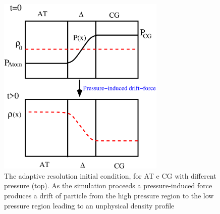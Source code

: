 \documentclass[aps,prb,preprint,citeautoscript]{revtex4}
\begin{document}
\begin{figure}
  \centering
  \includegraphics[angle=0,width=8cm]{pressure2.eps}
  \caption{The adaptive resolution initial condition, for AT e CG with different pressure (top). As the simulation proceeds a pressure-induced force produces a drift of particle from the high pressure region to the low pressure region leading to an unphysical density profile}
  \label{figpress}
\end{figure} 
\end{document}
